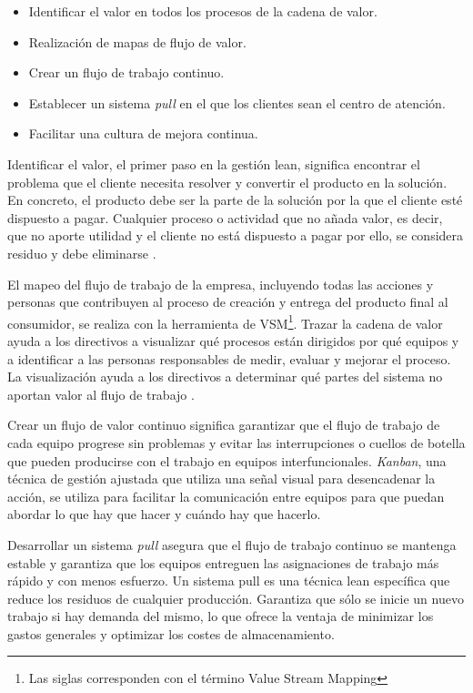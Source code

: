 \begin{itemize}
    \item Identificar el valor en todos los procesos de la cadena de valor.
    \item Realización de mapas de flujo de valor.
    \item Crear un flujo de trabajo continuo.
    \item Establecer un sistema \textit{pull} en el que los clientes sean el centro de atención.
    \item Facilitar una cultura de mejora continua.
\end{itemize}

Identificar el valor, el primer paso en la gestión lean, significa encontrar el problema que el cliente necesita resolver y convertir el producto en la solución.
En concreto, el producto debe ser la parte de la solución por la que el cliente esté dispuesto a pagar.
Cualquier proceso o actividad que no añada valor, es decir, que no aporte utilidad y el cliente no está dispuesto a pagar por ello, se considera residuo y debe eliminarse \cite{liker_toyota_2006}.

El mapeo del flujo de trabajo de la empresa, incluyendo todas las acciones y personas que contribuyen al proceso de creación y entrega del producto final al consumidor, se realiza con la herramienta de VSM\footnote{Las siglas corresponden con el término Value Stream Mapping}.
Trazar la cadena de valor ayuda a los directivos a visualizar qué procesos están dirigidos por qué equipos y a identificar a las personas responsables de medir, evaluar y mejorar el proceso.
La visualización ayuda a los directivos a determinar qué partes del sistema no aportan valor al flujo de trabajo \cite{slack_operations_2010}.

Crear un flujo de valor continuo significa garantizar que el flujo de trabajo de cada equipo progrese sin problemas y evitar las interrupciones o cuellos de botella que pueden producirse con el trabajo en equipos interfuncionales.
\textit{Kanban}, una técnica de gestión ajustada que utiliza una señal visual para desencadenar la acción, se utiliza para facilitar la comunicación entre equipos para que puedan abordar lo que hay que hacer y cuándo hay que hacerlo.

Desarrollar un sistema \textit{pull} asegura que el flujo de trabajo continuo se mantenga estable y garantiza que los equipos entreguen las asignaciones de trabajo más rápido y con menos esfuerzo. Un sistema pull es una técnica lean específica que reduce los residuos de cualquier producción. Garantiza que sólo se inicie un nuevo trabajo si hay demanda del mismo, lo que ofrece la ventaja de minimizar los gastos generales y optimizar los costes de almacenamiento.

